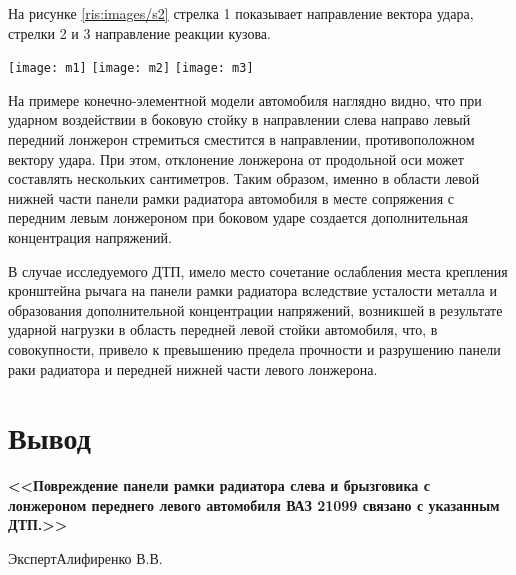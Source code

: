 На рисунке \ref{ris:images/s2}  стрелка 1 показывает направление  вектора удара, стрелки 2 и 3 направление реакции кузова.

\pagebreak

\begin{multicols}{3}[\columnsep=1cm]
\noindent	\texttt{[image: m1]}
	\columnbreak
	\texttt{[image: m2]}
	\columnbreak
	\texttt{[image: m3]}
\end{multicols}



  \vspace{3mm}

На примере конечно-элементной модели автомобиля  наглядно видно, что при  ударном воздействии в боковую стойку в направлении слева направо левый передний лонжерон стремиться сместится в направлении, противоположном вектору удара. При этом, отклонение лонжерона от продольной оси может составлять нескольких сантиметров. Таким образом, именно в области левой нижней части панели рамки радиатора автомобиля  в месте сопряжения с передним левым лонжероном при боковом ударе создается дополнительная  концентрация напряжений.

 В случае исследуемого ДТП, имело место  сочетание ослабления места крепления кронштейна  рычага на панели рамки радиатора вследствие  усталости металла и образования дополнительной концентрации напряжений, возникшей в результате ударной нагрузки в область передней левой стойки автомобиля, что, в совокупности, привело к превышению предела прочности и  разрушению панели раки радиатора и передней нижней части левого лонжерона.  

\section{Вывод} 


\textbf{  <<Повреждение панели рамки радиатора слева и брызговика с лонжероном переднего левого автомобиля ВАЗ 21099 связано  с указанным ДТП.>>	}
  
  
  \vspace{20mm}
{Эксперт}\hfill           {Алифиренко В.В.}


